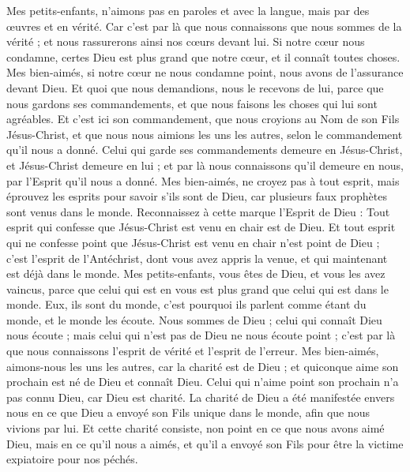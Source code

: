 \begin{multicols}{2}
Mes petits-enfants, n'aimons pas en paroles et avec la langue, mais par des œuvres et en vérité.
Car c'est par là que nous connaissons que nous sommes de la vérité ; et nous rassurerons ainsi nos cœurs devant lui.
Si notre cœur nous condamne, certes Dieu est plus grand que notre cœur, et il connaît toutes choses.
Mes bien-aimés, si notre cœur ne nous condamne point, nous avons de l’assurance devant Dieu.
Et quoi que nous demandions, nous le recevons de lui, parce que nous gardons ses commandements, et que nous faisons les choses qui lui sont agréables.
Et c'est ici son commandement, que nous croyions au Nom de son Fils Jésus-Christ, et que nous nous aimions les uns les autres, selon le commandement qu’il nous a donné.
Celui qui garde ses commandements demeure en Jésus-Christ, et Jésus-Christ demeure en lui ; et par là nous connaissons qu'il demeure en nous, par l'Esprit qu'il nous a donné.
\VerseOne{}Mes bien-aimés, ne croyez pas à tout esprit, mais éprouvez les esprits pour savoir s'ils sont de Dieu, car plusieurs faux prophètes sont venus dans le monde.
Reconnaissez à cette marque l'Esprit de Dieu : Tout esprit qui confesse que Jésus-Christ est venu en chair est de Dieu.
Et tout esprit qui ne confesse point que Jésus-Christ est venu en chair n'est point de Dieu ; c’est l'esprit de l'Antéchrist, dont vous avez appris la venue, et qui maintenant est déjà dans le monde.
Mes petits-enfants, vous êtes de Dieu, et vous les avez vaincus, parce que celui qui est en vous est plus grand que celui qui est dans le monde.
Eux, ils sont du monde, c'est pourquoi ils parlent comme étant du monde, et le monde les écoute.
Nous sommes de Dieu ; celui qui connaît Dieu nous écoute ; mais celui qui n'est pas de Dieu ne nous écoute point ; c’est par là que nous connaissons l'esprit de vérité et l'esprit de l’erreur.
Mes bien-aimés, aimons-nous les uns les autres, car la charité est de Dieu ; et quiconque aime son prochain est né de Dieu et connaît Dieu.
Celui qui n'aime point son prochain n'a pas connu Dieu, car Dieu est charité{}.
La charité de Dieu a été manifestée envers nous en ce que Dieu a envoyé son Fils unique dans le monde, afin que nous vivions par lui.
Et cette charité consiste, non point en ce que nous avons aimé Dieu, mais en ce qu'il nous a aimés, et qu'il a envoyé son Fils pour être la victime expiatoire pour nos péchés.

\end{multicols}
